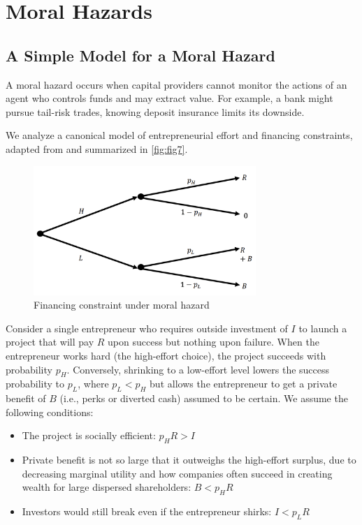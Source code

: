 \section{Moral Hazards}

\subsection{A Simple Model for a Moral Hazard}

A moral hazard occurs when capital providers cannot monitor the actions of an agent who controls funds and may extract value. For example, a  bank might pursue tail-risk trades, knowing deposit insurance limits its downside. 

We analyze a canonical model of entrepreneurial effort and financing constraints, adapted from \citet{holmstrom2011inside} and summarized in \autoref{fig:fig7}.

\begin{figure}[h]
    \centering
    \includegraphics[width=0.75\textwidth]{fig7.png}
    \caption{Financing constraint under moral hazard}
    \label{fig:fig7}
\end{figure}

Consider a single entrepreneur who requires outside investment of $I$ to launch a project that will pay $R$ upon success but nothing upon failure. When the entrepreneur works hard (the high-effort choice), the project succeeds with probability $p_H$. Conversely, shrinking to a low-effort level lowers the success probability to $p_L$, where $p_L < p_H$ but allows the entrepreneur to get a private benefit of $B$ (i.e., perks or diverted cash) assumed to be certain. We assume the following conditions:
\begin{itemize}
    \item The project is socially efficient: $p_H R > I$
    \item Private benefit is not so large that it outweighs the high-effort surplus, due to decreasing marginal utility and how companies often succeed in creating wealth for large dispersed shareholders: $B< p_H R$
    \item Investors would still break even if the entrepreneur shirks: $I < p_L R$
\end{itemize}

